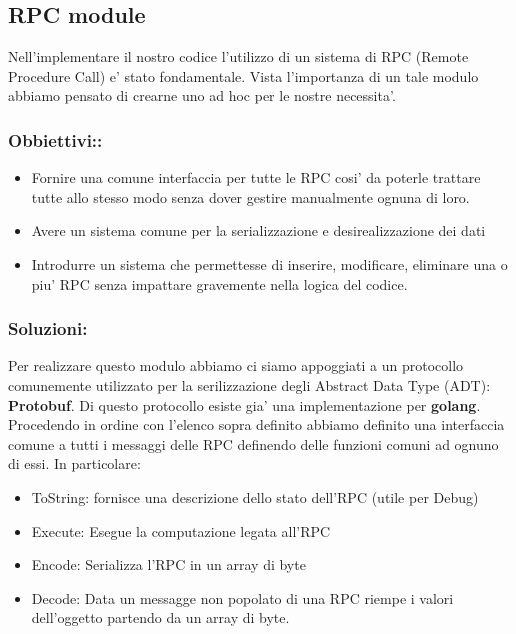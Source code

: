 \subsection{RPC module}
Nell'implementare il nostro codice l'utilizzo di un sistema di RPC (Remote Procedure Call) e' stato
fondamentale. Vista l'importanza di un tale modulo abbiamo pensato di crearne uno ad hoc per le 
nostre necessita'. 
\subsubsection{Obbiettivi::\\}
\begin{itemize}
    \item Fornire una comune interfaccia per tutte le RPC cosi' da poterle trattare tutte 
        allo stesso modo senza dover gestire manualmente ognuna di loro.
    \item Avere un sistema comune per la serializzazione e desirealizzazione dei dati
    \item Introdurre un sistema che permettesse di inserire, modificare, eliminare una o piu' RPC
        senza impattare gravemente nella logica del codice.
\end{itemize}
\subsubsection{Soluzioni:\\}
Per realizzare questo modulo abbiamo ci siamo appoggiati a un protocollo comunemente utilizzato 
per la serilizzazione degli Abstract Data Type (ADT): \textbf{Protobuf}.
Di questo protocollo esiste gia' una implementazione per \textbf{golang}.
Procedendo in ordine con l'elenco sopra definito abbiamo definito una interfaccia comune
a tutti i messaggi delle RPC definendo delle funzioni comuni ad ognuno di essi. In particolare:
\begin{itemize}
    \item ToString: fornisce una descrizione dello stato dell'RPC (utile per Debug)
    \item Execute: Esegue la computazione legata all'RPC
    \item Encode: Serializza l'RPC in un array di byte
    \item Decode: Data un messagge non popolato di una RPC riempe i valori dell'oggetto partendo
        da un array di byte.
\end{itemize}



